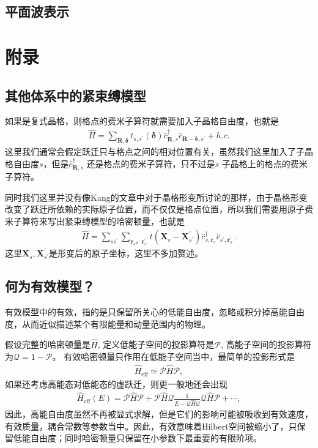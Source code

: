 \documentclass[10pt, oneside]{article}
\begin{document}
\subsection{平面波表示}


\section{附录}
\subsection{其他体系中的紧束缚模型}
如果是复式晶格，则格点的费米子算符就需要加入子晶格自由度，也就是
\begin{align}
	\hat{H} = \sum_{\bm{R}, \bm{\delta}} t_{s,s^{\prime}} \left(\bm{\delta}\right) \hat{c}^{\dagger}_{\bm{R}, s} \hat{c}_{\bm{R} - \bm{\delta}, s^{\prime}} + h.c.
\end{align}
这里我们通常会假定跃迁只与格点之间的相对位置有关，虽然我们这里加入了子晶格自由度\(s\)，但是\(\hat{c}^{\dagger}_{\bm{R}, s} \) 还是格点的费米子算符，只不过是\(s\) 子晶格上的格点的费米子算符。

同时我们这里并没有像Kang的文章中对于晶格形变所讨论的那样，由于晶格形变改变了跃迁所依赖的实际原子位置，而不仅仅是格点位置，所以我们需要用原子费米子算符来写出紧束缚模型的哈密顿量，也就是
\begin{align}
	\hat{H} = \sum_{s s^{\prime}}\sum_{\bm{r}_{s}，\bm{r}^{\prime}_{s^{\prime}}} t\left(\bm{X}_{s} - \bm{X}^{\prime}_{s^{\prime}}\right) \hat{c}^{\dagger}_{s, \bm{r}_{s}}  \hat{c}_{s^{\prime}, \bm{r}^{\prime}_{s^{\prime}}}.
\end{align}
这里\(\bm{X}_{s}, \bm{X}^{\prime}_{s^{\prime}}\)是形变后的原子坐标，这里不多加赘述。


\subsection{何为有效模型？}
有效模型中的有效，指的是只保留所关心的低能自由度，忽略或积分掉高能自由度，从而近似描述某个有限能量和动量范围内的物理。

假设完整的哈密顿量是\(\hat{H}\), 定义低能子空间的投影算符是\(\mathcal{P}\), 高能子空间的投影算符为\(\mathcal{Q} = 1 - 	\mathcal{P}\)。	有效哈密顿量只作用在低能子空间当中，最简单的投影形式是
\begin{align}
	\hat{H}_{\mathrm{eff}} \simeq \mathcal{P} \hat{H} \mathcal{P},
\end{align}
如果还考虑高能态对低能态的虚跃迁，则更一般地还会出现
\begin{align}
	\hat{H}_{\mathrm{eff}} \left(E\right) = \mathcal{P} \hat{H} \mathcal{P} + \mathcal{P} \hat{H} \mathcal{Q} \frac{1}{E - \mathcal{Q} \hat{H} \mathcal{Q}} \mathcal{Q} \hat{H} \mathcal{P} + \cdots,
\end{align}
因此，高能自由度虽然不再被显式求解，但是它们的影响可能被吸收到有效速度，有效质量，耦合常数等参数当中。因此，有效意味着Hilbert空间被缩小了，只保留低能自由度；同时哈密顿量只保留在小参数下最重要的有限阶项。
\end{document}
